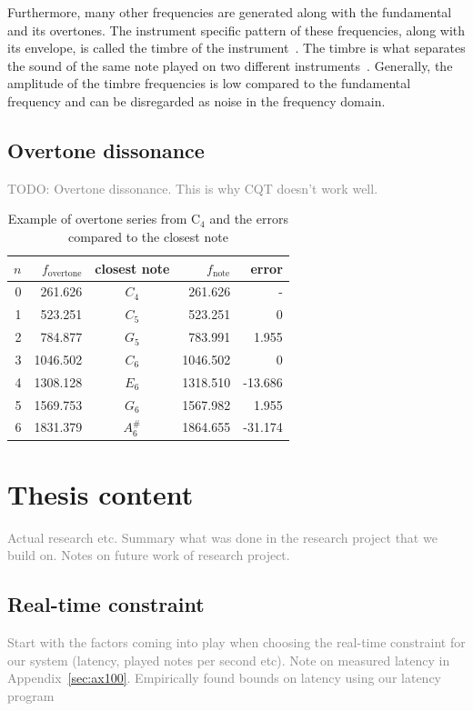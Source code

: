 \documentclass[10pt,twocolumn]{article}
\newcommand{\note}[2]{#1${}_{#2}$}
\begin{document}
Furthermore, many other frequencies are generated along with the fundamental and its overtones. The instrument specific pattern of these frequencies, along with its envelope, is called the timbre of the instrument~\cite{timbre}. The timbre is what separates the sound of the same note played on two different instruments~\cite{perception}. Generally, the amplitude of the timbre frequencies is low compared to the fundamental frequency and can be disregarded as noise in the frequency domain.

\subsection{Overtone dissonance}  \label{sec:dissonance}
\textcolor{gray}{TODO: Overtone dissonance. This is why CQT doesn't work well.}
\begin{table}[H]
    \centering
    \begin{tabular}{rrcrr}
        $n$ & $f_{\text{overtone}}$ & closest note & $f_\text{note}$ & error \\
        \hline
        0 & 261.626  & $C_4$    & 261.626  &  - \\
        1 & 523.251  & $C_5$    & 523.251  &  0 \\
        2 & 784.877  & $G_5$    & 783.991  &  1.955 \\
        3 & 1046.502 & $C_6$    & 1046.502 &  0 \\
        4 & 1308.128 & $E_6$    & 1318.510 &  -13.686 \\
        5 & 1569.753 & $G_6$    & 1567.982 &  1.955 \\
        6 & 1831.379 & $A^\#_6$ & 1864.655 &  -31.174
    \end{tabular}
    \caption{Example of overtone series from \note{C}{4} and the errors compared to the closest note}
    \label{tab:overseries}
\end{table}


\section{Thesis content}
\textcolor{gray}{Actual research etc. Summary what was done in the research project that we build on. Notes on future work of research project.}

\subsection{Real-time constraint}  \label{sec:constraint}
\textcolor{gray}{Start with the factors coming into play when choosing the real-time constraint for our system (latency, played notes per second etc). Note on measured latency in Appendix~\ref{sec:ax100}. Empirically found bounds on latency using our latency program}
\end{document}
